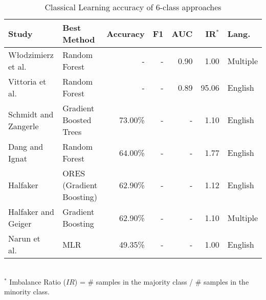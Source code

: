 \begin{table}[ht]
    \caption{Classical Learning accuracy of 6-class approaches }
    \label{tab:CL_performance_6class}
    \centering
    \begin{tabular}{m{} l r r r r l}
        \toprule
        \textbf{Study} & \textbf{Best Method} & \textbf{Accuracy} & \textbf{F1} & \textbf{AUC} & \textbf{IR$^*$} & \textbf{Lang.} \\ 
        \midrule
        Włodzimierz et al.~\cite{Lewoniewski2016_lr18} & Random Forest & - & - & 0.90 & 1.00 & Multiple \\
        Vittoria et al.~\cite{Cozza2016_lr92} & Random Forest & - & - & 0.89 & 95.06 & English \\
        Schmidt and Zangerle~\cite{Schmidt2019_lr78} & Gradient Boosted Trees & 73.00\% & - & - & 1.10 & English \\
        Dang and Ignat~\cite{Dang2016_lr16} & Random Forest & 64.00\% & - & - & 1.77 & English \\
        Halfaker~\cite{Halfaker2017_lr22} & ORES (Gradient Boosting) & 62.90\% & - & - & 1.12 & English \\
        Halfaker and Geiger~\cite{Halfaker2020_lr1055} & Gradient Boosting & 62.90\% & - & - & 1.10 & Multiple \\
        Narun et al.~\cite{Raman2020_lr64} & MLR & 49.35\% & - & - & 1.00 & English \\
        \bottomrule
    \end{tabular}
    \\ \vspace{0.1cm}
    \footnotesize
    $^*$ Imbalance Ratio ($IR$) = \# samples in the majority class / \# samples in the minority class. 
\end{table}